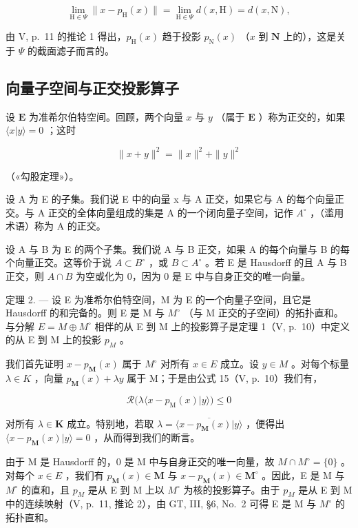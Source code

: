 \[
\lim _ {\mathrm{H} \in \Psi} \| x - p _ {\mathrm{H}} (x) \| = \lim _ {\mathrm{H} \in \Psi} d (x, \mathrm{H}) = d (x, \mathrm{N}),
\]

由 V, p.~11 的推论 1 得出，\(p_{\mathrm{H}}(x)\) 趋于投影 \(p_{\mathrm{N}}(x)\) （\(x\) 到 \(\mathbf{N}\) 上的），这是关于 \(\Psi\) 的截面滤子而言的。

\subsection{向量子空间与正交投影算子}

设 \(\mathbf{E}\) 为准希尔伯特空间。回顾，两个向量 \(x\) 与 \(y\) （属于 \(\mathbf{E}\) ）称为正交的，如果 \(\langle x|y\rangle = 0\) ；这时

\[
\| x + y \| ^ {2} = \| x \| ^ {2} + \| y \| ^ {2}\tag{16}
\]

（«勾股定理»）。

设 A 为 E 的子集。我们说 E 中的向量 x 与 A 正交，如果它与 A 的每个向量正交。与 A 正交的全体向量组成的集是 A 的一个闭向量子空间，记作 \(A^{\circ}\) ，（滥用术语）称为 A 的正交。

设 A 与 B 为 E 的两个子集。我们说 A 与 B 正交，如果 A 的每个向量与 B 的每个向量正交。这等价于说 \(A \subset B^{\circ}\) ，或 \(B \subset A^{\circ}\) 。若 E 是 Hausdorff 的且 A 与 B 正交，则 \(A \cap B\) 为空或化为 0，因为 0 是 E 中与自身正交的唯一向量。

定理 2. --- 设 E 为准希尔伯特空间，M 为 E 的一个向量子空间，且它是 Hausdorff 的和完备的。则 E 是 M 与 \(M^{\circ}\) （与 M 正交的子空间）的拓扑直和。与分解 \(E = M \oplus M^{\circ}\) 相伴的从 E 到 M 上的投影算子是定理 1（V, p.~10）中定义的从 E 到 M 上的投影 \(p_{M}\) 。

我们首先证明 \(x - p_{\mathbf{M}}(x)\) 属于 \(M^{\circ}\) 对所有 \(x \in E\) 成立。设 \(y \in M\) 。对每个标量 \(\lambda \in K\) ，向量 \(p_{\mathbf{M}}(x) + \lambda y\) 属于 M；于是由公式 15（V, p.~10）我们有，

\[
\mathcal {R} \big (\lambda \langle x - p _ {\mathrm{M}} (x) | y \rangle \big) \leqslant 0
\]

对所有 \(\lambda \in \mathbf{K}\) 成立。特别地，若取 \(\lambda = \overline{\langle x - p_{\mathbf{M}}(x)|y\rangle}\) ，便得出 \(\langle x - p_{\mathbf{M}}(x)|y\rangle = 0\) ，从而得到我们的断言。

由于 M 是 Hausdorff 的，0 是 M 中与自身正交的唯一向量，故 \(M \cap M^{\circ} = \{0\}\) 。对每个 \(x \in E\) ，我们有 \(p_{\mathbf{M}}(x) \in \mathbf{M}\) 与 \(x - p_{\mathbf{M}}(x) \in \mathbf{M}^{\circ}\) 。因此，E 是 M 与 \(M^{\circ}\) 的直和，且 \(p_{M}\) 是从 E 到 M 上以 \(M^{\circ}\) 为核的投影算子。由于 \(p_{M}\) 是从 E 到 M 中的连续映射（V, p.~11, 推论 2），由 GT, III, §6, No.~2 可得 E 是 M 与 \(M^{\circ}\) 的拓扑直和。

